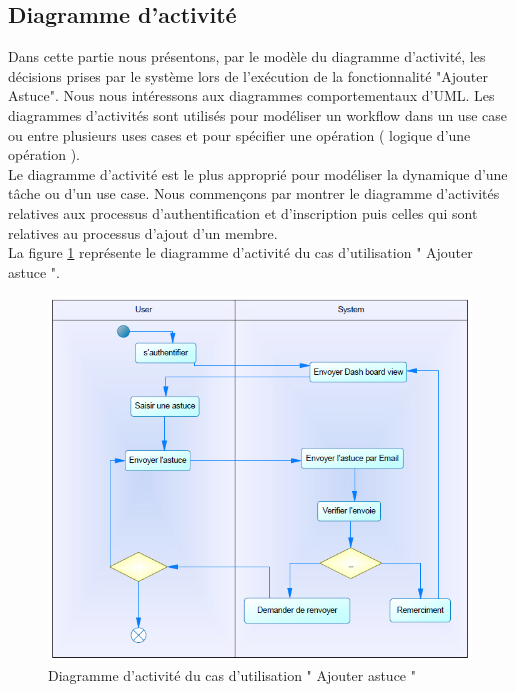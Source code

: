 \subsection{Diagramme d'activité}

\qquad Dans cette partie nous présentons, par le modèle du diagramme d'activité, les décisions prises par le système lors de l'exécution de la fonctionnalité "Ajouter Astuce". Nous nous intéressons aux diagrammes comportementaux d’UML. Les
diagrammes d’activités sont utilisés pour modéliser un workflow dans un use case ou entre plusieurs uses cases et pour spécifier une opération ( logique d’une opération ).\\

Le diagramme d’activité est le plus approprié pour modéliser la dynamique d’une tâche ou d’un use case. Nous commençons par montrer le diagramme d’activités relatives aux processus d’authentification et d’inscription puis celles qui sont relatives au processus d’ajout d’un membre.\\

La figure \ref{fig3.10} représente le diagramme d'activité du cas d'utilisation " Ajouter astuce ".

\begin{figure}[!h]
	\begin{center}
		\includegraphics[width=0.64\textheight]{figures/ad1}
	\end{center}
	\caption{Diagramme d'activité du cas d'utilisation " Ajouter astuce "}
	\label{fig3.10}
\end{figure}

